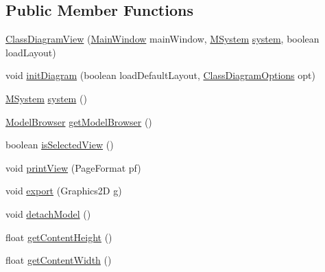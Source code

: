 \subsection*{Public Member Functions}
\begin{DoxyCompactItemize}
\item 
\hyperlink{classorg_1_1tzi_1_1use_1_1gui_1_1views_1_1diagrams_1_1classdiagram_1_1_class_diagram_view_ad98f040f1adf9f3564e2cbbd5bfdc5aa}{Class\-Diagram\-View} (\hyperlink{classorg_1_1tzi_1_1use_1_1gui_1_1main_1_1_main_window}{Main\-Window} main\-Window, \hyperlink{classorg_1_1tzi_1_1use_1_1uml_1_1sys_1_1_m_system}{M\-System} \hyperlink{classorg_1_1tzi_1_1use_1_1gui_1_1views_1_1diagrams_1_1classdiagram_1_1_class_diagram_view_a5cefcc7422936bc8e05967f9922572ec}{system}, boolean load\-Layout)
\item 
void \hyperlink{classorg_1_1tzi_1_1use_1_1gui_1_1views_1_1diagrams_1_1classdiagram_1_1_class_diagram_view_ae7218106852c1a986a7dca8109e3435a}{init\-Diagram} (boolean load\-Default\-Layout, \hyperlink{classorg_1_1tzi_1_1use_1_1gui_1_1views_1_1diagrams_1_1classdiagram_1_1_class_diagram_options}{Class\-Diagram\-Options} opt)
\item 
\hyperlink{classorg_1_1tzi_1_1use_1_1uml_1_1sys_1_1_m_system}{M\-System} \hyperlink{classorg_1_1tzi_1_1use_1_1gui_1_1views_1_1diagrams_1_1classdiagram_1_1_class_diagram_view_a5cefcc7422936bc8e05967f9922572ec}{system} ()
\item 
\hyperlink{classorg_1_1tzi_1_1use_1_1gui_1_1main_1_1_model_browser}{Model\-Browser} \hyperlink{classorg_1_1tzi_1_1use_1_1gui_1_1views_1_1diagrams_1_1classdiagram_1_1_class_diagram_view_a57786d29fee9a8e8e44740b29d20b51c}{get\-Model\-Browser} ()
\item 
boolean \hyperlink{classorg_1_1tzi_1_1use_1_1gui_1_1views_1_1diagrams_1_1classdiagram_1_1_class_diagram_view_a4970885f3ee5557cb15b92f7540d4914}{is\-Selected\-View} ()
\item 
void \hyperlink{classorg_1_1tzi_1_1use_1_1gui_1_1views_1_1diagrams_1_1classdiagram_1_1_class_diagram_view_aa939569b3c257817f0cb3cf3ecf3dcef}{print\-View} (Page\-Format pf)
\item 
void \hyperlink{classorg_1_1tzi_1_1use_1_1gui_1_1views_1_1diagrams_1_1classdiagram_1_1_class_diagram_view_a5bac0e64763260ec3af36a846590d29f}{export} (Graphics2\-D g)
\item 
void \hyperlink{classorg_1_1tzi_1_1use_1_1gui_1_1views_1_1diagrams_1_1classdiagram_1_1_class_diagram_view_ad4b728afc26da8442e3eafc50a60733b}{detach\-Model} ()
\item 
float \hyperlink{classorg_1_1tzi_1_1use_1_1gui_1_1views_1_1diagrams_1_1classdiagram_1_1_class_diagram_view_a8041925dfd24a3b513a6fea68303c30b}{get\-Content\-Height} ()
\item 
float \hyperlink{classorg_1_1tzi_1_1use_1_1gui_1_1views_1_1diagrams_1_1classdiagram_1_1_class_diagram_view_a504d8203a9fbba4ea338f78a6c40bef7}{get\-Content\-Width} ()
\end{DoxyCompactItemize}


